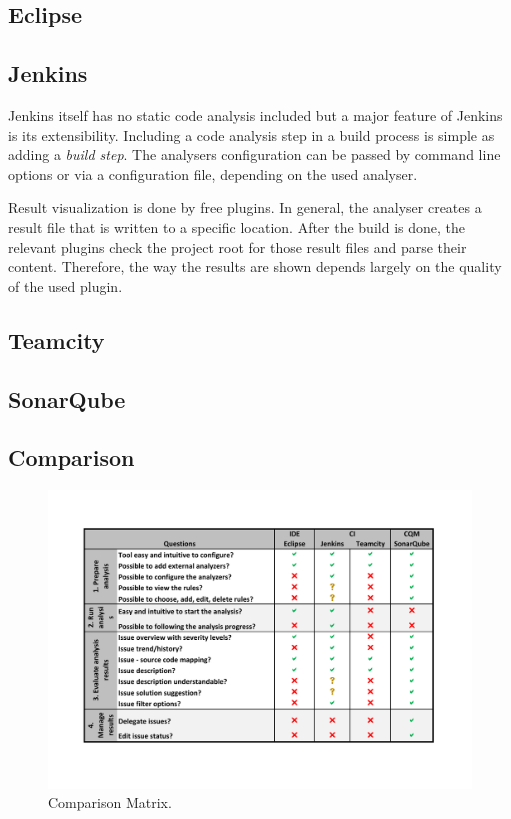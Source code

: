 \documentclass[conference]{IEEEtran}
\begin{document}
\subsection{Eclipse}
\label{subsec:evaluation_eclipse}

\subsection{Jenkins}
\label{subsec:evaluation_jenkins}
Jenkins itself has no static code analysis included but a major feature of Jenkins is its extensibility. Including a code analysis step in a build process is simple as adding a \textit{build step}. The analysers configuration can be passed by command line options or via a configuration file, depending on the used analyser.

Result visualization is done by free plugins. In general, the analyser creates a result file that is written to a specific location. After the build is done, the relevant plugins check the project root for those result files and parse their content. Therefore, the way the results are shown depends largely on the quality of the used plugin.


\subsection{Teamcity}
\label{subsec:evaluation_teamcity}

\subsection{SonarQube}
\label{subsec:evaluation_sonarqube}


\subsection{Comparison}
\label{subsec:comparation}

\begin{figure}[t]
	\includegraphics[width=\textwidth]{img/comparation}
	\caption{Comparison Matrix.}
	\label{fig:comparison_matrix}
\end{figure}
\end{document}
